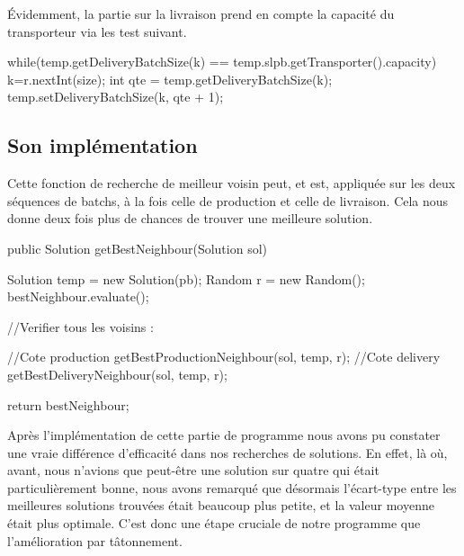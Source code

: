 Évidemment, la partie sur la livraison prend en compte la capacité du transporteur via les test suivant.

\begin{java}
while(temp.getDeliveryBatchSize(k) == temp.slpb.getTransporter().capacity) {
	k=r.nextInt(size);
}
int qte = temp.getDeliveryBatchSize(k);
temp.setDeliveryBatchSize(k, qte + 1);
\end{java}

\vspace{1em}

\subsection{Son implémentation}
Cette fonction de recherche de meilleur voisin peut, et est, appliquée sur les deux séquences de batchs, à la fois celle de production et celle de livraison. Cela nous donne deux fois plus de chances de trouver une meilleure solution.

\begin{java}
public Solution getBestNeighbour(Solution sol) {
	Solution temp = new Solution(pb);
	Random r = new Random();
	bestNeighbour.evaluate();
	
	//Verifier tous les voisins :
	
	//Cote production
	getBestProductionNeighbour(sol, temp, r);
	//Cote delivery
	getBestDeliveryNeighbour(sol, temp, r);
	
	return bestNeighbour;
}
\end{java}

\vspace{1em}

Après l'implémentation de cette partie de programme nous avons pu constater une vraie différence d'efficacité dans nos recherches de solutions. En effet, là où, avant, nous n'avions que peut-être une solution sur quatre qui était particulièrement bonne, nous avons remarqué que désormais l'écart-type entre les meilleures solutions trouvées était beaucoup plus petite, et la valeur moyenne était plus optimale. C'est donc une étape cruciale de notre programme que l'amélioration par tâtonnement.